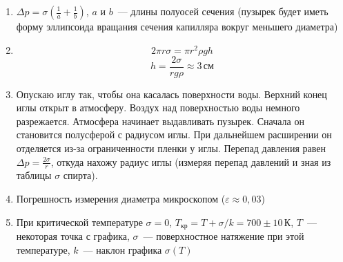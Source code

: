 \documentclass[a4paper, 12pt]{article}
\begin{document}
    \begin{enumerate}
        \item $\Delta p = \sigma\left(\frac{1}{a} +\frac{1}{b}\right)$, $a$ и $b$~--- длины полуосей сечения
        (пузырек будет иметь форму эллипсоида вращания сечения капилляра вокруг меньшего диаметра)
        \item \[2\pi r \sigma = \pi r^2 \rho g h\]
        \[h = \frac{2\sigma}{rg\rho}\approx 3\,\text{см}\]
        \item Опускаю иглу так, чтобы она касалась поверхности воды. Верхний конец иглы
        открыт в атмосферу. Воздух над поверхностью воды немного разрежается.
        Атмосфера начинает выдавливать пузырек. Сначала он становится полусферой с радиусом иглы.
        При дальнейшем расширении он отделяется из-за ограниченности пленки у иглы. Перепад
        давления равен $\Delta p = \frac{2\sigma}{r}$, откуда нахожу радиус иглы (измеряя перепад давлений и зная из таблицы $\sigma$ спирта).
        \item Погрешность измерения диаметра микроскопом ($\varepsilon\approx 0{,}03$)
        \item При критической температуре $\sigma=0$, $T_\text{кр}=T + \sigma / k = 700\pm 10\,\text{К}$,
        $T$~--- некоторая точка с графика, $\sigma$~--- поверхностное натяжение при этой температуре,
        $k$~--- наклон графика $\sigma(T)$
    \end{enumerate}
\end{document}
